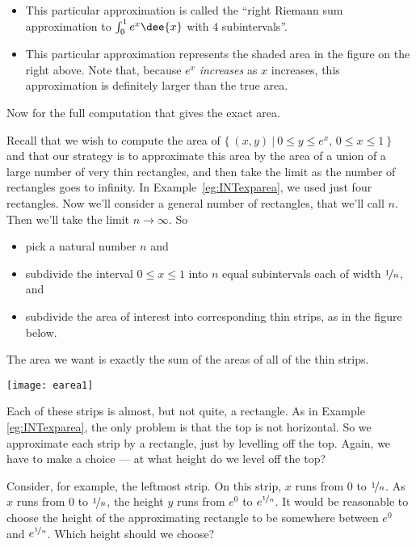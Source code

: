 \begin{eg}
\begin{itemize}
\begin{itemize}
\item This particular approximation is called the ``right Riemann sum
approximation to $\int_0^1 e^x\dee{x}$ with $4$ subintervals''.

\item This particular approximation represents the shaded area in the figure on
the right above. Note that, because $e^x$ \emph{increases} as $x$ increases,
this approximation is definitely larger than the true area.
\end{itemize}
\end{itemize}
\end{eg}

Now for the full computation that gives the exact area.
\begin{eg}\label{eg:INTexpareaB}
Recall that we wish to compute the area of $\big\{\ (x,y)\ \big|\ 0\le y\le
e^x$, $0\le x\le 1\ \big\}$ and that our strategy is to approximate this area by
the area of a union of a large number of very thin rectangles, and
then take the limit as the number of rectangles goes to infinity. In
Example~\ref{eg:INTexparea}, we used just four rectangles. Now we'll consider a
general number of rectangles, that we'll call $n$. Then we'll take the limit
$n\rightarrow\infty$. So
\begin{itemize}
\item pick a natural number $n$ and

\item subdivide the interval $0\le x\le 1$ into $n$ equal subintervals
each of width $\nicefrac{1}{n}$, and

\item subdivide the area of interest into corresponding thin strips, as in the
figure below.
\end{itemize}
The area we want is exactly the sum of the areas of all of the thin strips.
\begin{efig}
\begin{center}
   \texttt{[image: earea1]}
\end{center}
\end{efig}
Each of these strips is almost, but not quite, a rectangle. As in Example
\ref{eg:INTexparea}, the only problem is that the top is not horizontal. So we
approximate each strip by a rectangle, just by levelling off the top. Again, we
have to make a choice --- at what height do we level off the top?

Consider, for example, the leftmost strip. On this strip, $x$ runs from $0$ to
$\nicefrac{1}{n}$. As $x$ runs from $0$ to $\nicefrac{1}{n}$, the height $y$
runs from  $e^0$ to $e^{\nicefrac{1}{n}}$. It would be reasonable to choose the
height of the approximating rectangle to be somewhere between $e^0$ and
$e^{\nicefrac{1}{n}}$. Which height should we choose?


\end{eg}

